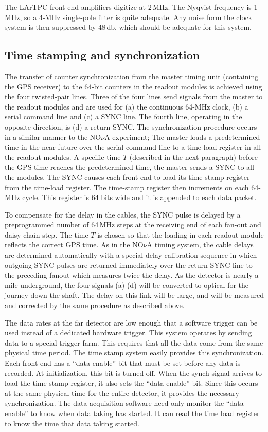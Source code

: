 The LArTPC front-end amplifiers digitize at 2\,MHz.  The Nyqvist
frequency is 1 MHz, so a 4-MHz single-pole filter is quite adequate.
Any noise form the clock system is then suppressed by 48\,db, which
should be adequate for this system.

\subsection{Time stamping and synchronization}

The transfer of counter synchronization from the master timing unit (containing the
GPS receiver) to the 64-bit counters in the readout modules is achieved
using the four twisted-pair lines.  Three of the four lines send
signals from the master to the readout modules and are used for (a)
the continuous 64-MHz clock, (b) a serial command line and (c) a SYNC
line. The fourth line, operating in the opposite direction, is (d) a
return-SYNC.  The synchronization procedure occurs in a similar manner
to the NO$\nu$A experiment; The master loads a predetermined time in the
near future over the serial command line to a time-load register in
all the readout modules.  A specific time $T$ (described in the next paragraph)
before the GPS time reaches the predetermined time, the master sends a
SYNC to all the modules.  The SYNC causes each front end to load its
time-stamp register from the time-load register.  The time-stamp
register then increments on each 64-MHz cycle.  This register is 64
bits wide and it is appended to each data packet.

To compensate for the delay in the cables, the SYNC pulse is delayed
by a preprogrammed number of 64\,MHz steps at the receiving end of
each fan-out and daisy chain step.  The time $T$ %
is
chosen so that the loading in each readout module reflects the correct
GPS time.  As in the NO$\nu$A timing system, the cable delays are
determined automatically with a special delay-calibration sequence in
which outgoing SYNC pulses are returned immediately over the
return-SYNC line to the preceding fanout which measures twice the
delay.  As the detector is nearly a mile underground, the four signals
(a)-(d) will be converted to optical for the journey down the shaft.
The delay on this link will be large, and will be measured and
corrected by the same procedure as described above.

The data rates at the far detector are low enough that a software
trigger can be used instead of a dedicated hardware trigger.  This
system operates by sending data to a special trigger farm.  This
requires that all the data come from the same physical time period.
The time stamp system easily provides this synchronization.  Each
front end has a ``data enable'' bit that must be set before any data is
recorded.  At initialization, this bit is turned off.  When the synch
signal arrives to load the time stamp register, it also sets the ``data
enable'' bit.  Since this occurs at the same physical time for the
entire detector, it provides the necessary synchronization.  The data
acquisition software need only monitor the ``data enable'' to know when
data taking has started.  It can read the time load register to know
the time that data taking started.

